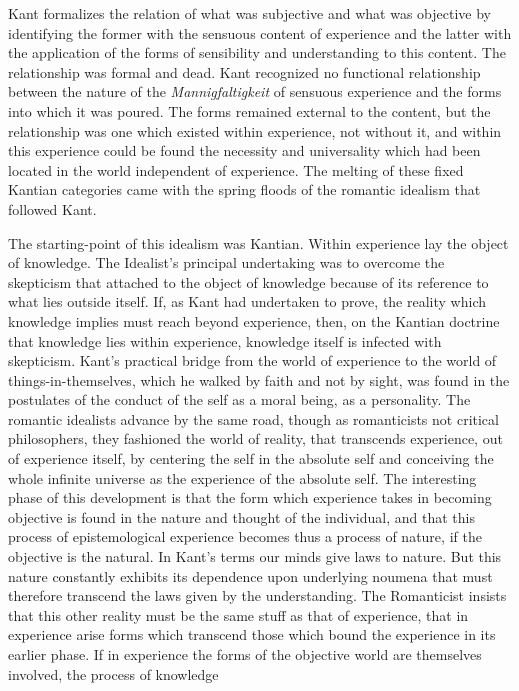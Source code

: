 \documentclass[12pt]{article}
\begin{document}
Kant formalizes the relation of what was subjective
and what was objective by identifying the former with
the sensuous content of experience and the latter with
the application of the forms of sensibility and understanding
to this content. The relationship was formal
and dead. Kant recognized no functional relationship
between the nature of the \emph{Mannigfaltigkeit} of sensuous
experience and the forms into which it was poured. The
forms remained external to the content, but the relationship
was one which existed within experience, not
without it, and within this experience could be found
the necessity and universality which had been located
in the world independent of experience. The melting
of these fixed Kantian categories came with the spring
floods of the romantic idealism that followed Kant.


The starting-point of this idealism was Kantian.
Within experience lay the object of knowledge. The
Idealist's principal undertaking was to overcome the
skepticism that attached to the object of knowledge
because of its reference to what lies outside itself. If,
as Kant had undertaken to prove, the reality which
knowledge implies must reach beyond experience, then,
on the Kantian doctrine that knowledge lies within
experience, knowledge itself is infected with skepticism.
Kant's practical bridge from the world of experience
to the world of things-in-themselves, which he walked
by faith and not by sight, was found in the postulates
of the conduct of the self as a moral being, as a personality.
The romantic idealists advance by the same
road, though as romanticists not critical philosophers,
they fashioned the world of reality, that transcends
experience, out of experience itself, by centering the
self in the absolute self and conceiving the whole infinite
universe as the experience of the absolute self.
The interesting phase of this development is that the
form which experience takes in becoming objective is
found in the nature and thought of the individual, and
that this process of epistemological experience becomes
thus a process of nature, if the objective is the natural.
In Kant's terms our minds give laws to nature. But
this nature constantly exhibits its dependence upon
underlying noumena that must therefore transcend the
laws given by the understanding. The Romanticist insists
that this other reality must be the same stuff as
that of experience, that in experience arise forms which
transcend those which bound the experience in its earlier
phase. If in experience the forms of the objective
world are themselves involved, the process of knowledge
\end{document}
